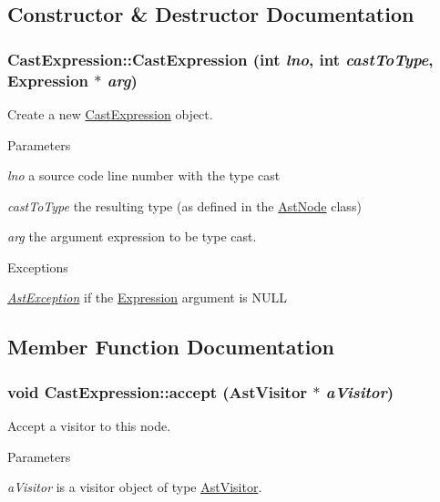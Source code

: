 \subsection{Constructor \& Destructor Documentation}
\hypertarget{classCastExpression_a1c5bdbe92eabf17c09577c39937f4ff0}{
\subsubsection[{CastExpression}]{\setlength{\rightskip}{0pt plus 5cm}CastExpression::CastExpression (int {\em lno}, \/  int {\em castToType}, \/  {\bf Expression} $\ast$ {\em arg})}}
\label{classCastExpression_a1c5bdbe92eabf17c09577c39937f4ff0}
Create a new \hyperlink{classCastExpression}{CastExpression} object.


\begin{DoxyParams}{Parameters}
\item[{\em lno}]a source code line number with the type cast \item[{\em castToType}]the resulting type (as defined in the \hyperlink{classAstNode}{AstNode} class) \item[{\em arg}]the argument expression to be type cast. \end{DoxyParams}

\begin{DoxyExceptions}{Exceptions}
\item[{\em \hyperlink{classAstException}{AstException}}]if the \hyperlink{classExpression}{Expression} argument is NULL \end{DoxyExceptions}


\subsection{Member Function Documentation}
\hypertarget{classCastExpression_af98e34f83dce5fec6d21f4baf4679dea}{
\subsubsection[{accept}]{\setlength{\rightskip}{0pt plus 5cm}void CastExpression::accept ({\bf AstVisitor} $\ast$ {\em aVisitor})}}
\label{classCastExpression_af98e34f83dce5fec6d21f4baf4679dea}
Accept a visitor to this node. 
\begin{DoxyParams}{Parameters}
\item[{\em aVisitor}]is a visitor object of type \hyperlink{classAstVisitor}{AstVisitor}. \end{DoxyParams}


